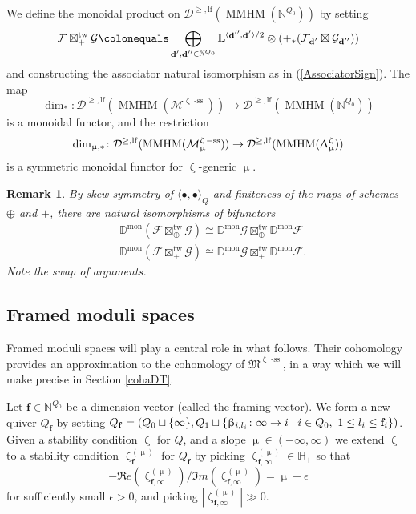 \documentclass[a4paper,10pt]{amsart}
\renewcommand{\beta}{\upbeta}
\renewcommand{\zeta}{\upzeta}
\renewcommand{\Lambda}{\Uplambda}
\renewcommand{\mu}{\upmu}
\newtheorem{remark}[theorem]{Remark}
\newcommand{\DD}{\mathbb{D}}
\newcommand{\ff}{\mathbf{f}}
\newcommand{\LL}{\mathbb{L}}
\newcommand{\Mst}{\mathfrak{M}}
\DeclareMathOperator{\sst}{-ss}
\DeclareMathOperator{\tw}{tw}
\DeclareMathOperator{\mon}{mon}
\DeclareMathOperator{\MMHM}{MMHM}
\DeclareMathOperator{\dd}{\mathbf{d}}
\newcommand{\Dulf}{\mathcal{D}^{\geq, \mathrm{lf}}}
\begin{document}
We define the monoidal product on $\Dulf(\MMHM(\mathbb{N}^{Q_0}))$ by setting 
\begin{equation}
\label{AssociatorSign}
\mathcal{F}\boxtimes_{+}^{\tw} \mathcal{G}\colonequals \bigoplus_{\dd',\dd''\in\mathbb{N}^{Q_0}}\LL^{\langle \dd'',\dd'\rangle/2}\otimes\left(+_*(\mathcal{F}_{\dd'}\boxtimes\mathcal{G}_{\dd''})\right)
\end{equation}
and constructing the associator natural isomorphism as in (\ref{AssociatorSign}).  The map 
\[
\dim_*\colon \Dulf(\MMHM(\mathcal{M}^{\zeta\sst}))\rightarrow \Dulf(\MMHM(\mathbb{N}^{Q_0}))
\]
is a monoidal functor, and the restriction
\[
\dim_{\mu,*}\colon \Dulf(\MMHM(\mathcal{M}_{\mu}^{\zeta\sst}))\rightarrow \Dulf(\MMHM(\Lambda^{\zeta}_{\mu}))
\]
is a symmetric monoidal functor for $\zeta$-generic $\mu$.
\begin{remark}\label{twDual}
By skew symmetry of $\langle \bullet,\bullet\rangle_Q$ and finiteness of the maps of schemes $\oplus$ and $+$, there are natural isomorphisms of bifunctors
\begin{align*}
&\DD^{\mon}(\mathcal{F}\boxtimes_{\oplus}^{\tw}\mathcal{G})\cong \DD^{\mon}\mathcal{G}\boxtimes_{\oplus}^{\tw}\DD^{\mon}\mathcal{F}\\
&\DD^{\mon}(\mathcal{F}\boxtimes_{+}^{\tw}\mathcal{G})\cong \DD^{\mon}\mathcal{G}\boxtimes_{+}^{\tw}\DD^{\mon}\mathcal{F}.
\end{align*}
Note the swap of arguments.
\end{remark}



\subsection{Framed moduli spaces}
\label{framedSec}
Framed moduli spaces will play a central role in what follows.  Their cohomology provides an approximation to the cohomology of $\Mst^{\zeta\sst}$, in a way which we will make precise in Section \ref{cohaDT}.  

Let $\ff\in\mathbb{N}^{Q_0}$ be a dimension vector (called the framing vector).  We form a new quiver $Q_{\ff}$ by setting $Q_{\ff}=(Q_0\sqcup\{\infty\}, Q_1\sqcup \{\beta_{i,l_i}\colon \infty \to i \mid i\in Q_0, \hbox{ }1\le l_i\le \ff_i \})$.  Given a stability condition $\zeta$ for $Q$, and a slope $\mu\in(-\infty,\infty)$ we extend $\zeta$ to a stability condition $\zeta^{(\mu)}_{\ff}$ for $Q_{\ff}$ by picking $\zeta^{(\mu)}_{\ff,\infty}\in\mathbb{H}_+$ so that 
\[
-\Re e(\zeta^{(\mu)}_{\ff,\infty})/\Im m(\zeta^{(\mu)}_{\ff,\infty})=\mu+\epsilon
\]
for sufficiently small $\epsilon>0$, and picking $|\zeta_{\ff,\infty}^{(\mu)}|\gg 0$.
\end{document}
